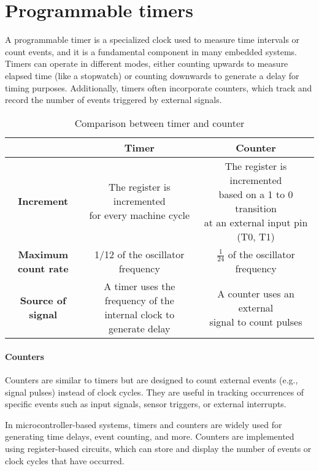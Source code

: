 \section{Programmable timers}

A programmable timer is a specialized clock used to measure time intervals or count events, and it is a fundamental component in many embedded systems. 
Timers can operate in different modes, either counting upwards to measure elapsed time (like a stopwatch) or counting downwards to generate a delay for timing purposes. 
Additionally, timers often incorporate counters, which track and record the number of events triggered by external signals.
\begin{table}[H]
    \centering
    \begin{tabular}{|c|c|c|}
    \hline
    & \textbf{Timer} & \textbf{Counter} \\ 
    \hline
    \textbf{Increment} & \makecell{The register is incremented \\ for every machine cycle} & \makecell{The register is incremented \\ based on a 1 to 0 transition \\ at an external input pin (T0, T1)} \\ 
    \hline
    \makecell{\textbf{Maximum} \\ \textbf{count rate}} & 1/12 of the oscillator frequency & $\frac{1}{24}$ of the oscillator frequency \\ 
    \hline
    \textbf{Source of signal} &\makecell{A timer uses the frequency of the \\ internal clock to generate delay} & \makecell{A counter uses an external \\ signal to count pulses} \\ 
    \hline
    \end{tabular}
    \caption{Comparison between timer and counter}
\end{table}

\paragraph*{Counters}
Counters are similar to timers but are designed to count external events (e.g., signal pulses) instead of clock cycles. 
They are useful in tracking occurrences of specific events such as input signals, sensor triggers, or external interrupts.

In microcontroller-based systems, timers and counters are widely used for generating time delays, event counting, and more. 
Counters are implemented using register-based circuits, which can store and display the number of events or clock cycles that have occurred.

